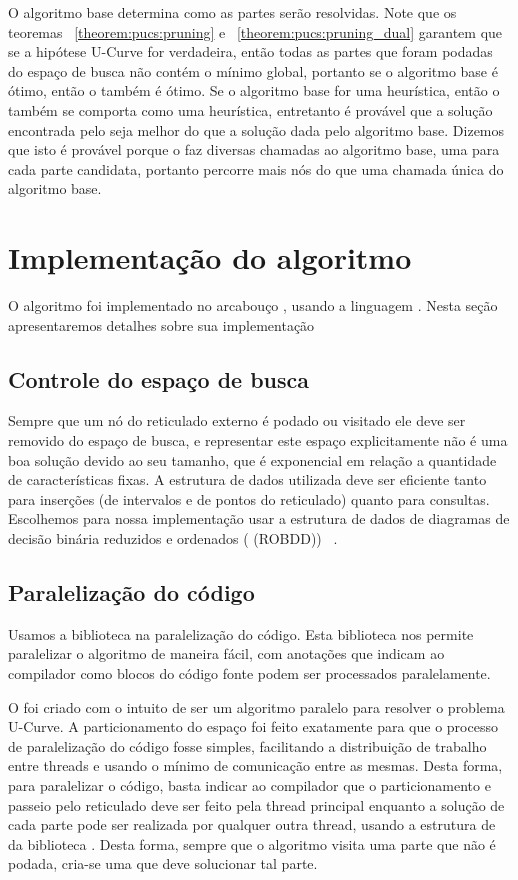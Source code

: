 O algoritmo base determina como as partes serão resolvidas. Note que os 
teoremas ~\ref{theorem:pucs:pruning} e ~\ref{theorem:pucs:pruning_dual}
garantem que se a hipótese U-Curve for verdadeira, então todas as partes
que foram podadas do espaço de busca não contém o mínimo global, 
portanto se o algoritmo base é ótimo, então o  também é
ótimo. Se o algoritmo base for uma heurística, então o 
também se comporta como uma heurística, entretanto é provável que a 
solução encontrada pelo  seja melhor do que a solução 
dada pelo algoritmo base. Dizemos que isto é provável porque o 
 faz diversas chamadas ao algoritmo base, uma para cada
parte candidata, portanto percorre mais nós do que uma chamada única do
algoritmo base.

\section{Implementação do algoritmo}
O algoritmo  foi implementado no arcabouço 
, usando a linguagem . Nesta seção 
apresentaremos detalhes sobre sua implementação 

\subsection{Controle do espaço de busca}
Sempre que um nó do reticulado externo é podado ou visitado ele deve ser
removido do espaço de busca, e representar este espaço explicitamente 
não é uma boa solução devido ao seu tamanho, que é exponencial em 
relação a quantidade de características fixas. A estrutura de dados 
utilizada deve ser eficiente tanto para inserções (de intervalos e de 
pontos do reticulado) quanto para consultas. Escolhemos para nossa 
implementação usar a estrutura de dados de diagramas de decisão binária
reduzidos e ordenados ( (ROBDD)) ~\cite{Bry86}.

\subsection{Paralelização do código}
Usamos a biblioteca  na paralelização do código.
Esta biblioteca nos permite paralelizar o algoritmo de maneira fácil,
com anotações que indicam ao compilador como blocos do código fonte 
podem ser processados paralelamente.

O  foi criado com o intuito de ser um algoritmo paralelo
para resolver o problema U-Curve. A particionamento do espaço foi feito
exatamente para que o processo de paralelização do código fosse simples,
facilitando a distribuição de trabalho entre threads e usando o mínimo
de comunicação entre as mesmas. Desta forma, para paralelizar o código,
basta indicar ao compilador que o particionamento e passeio pelo 
reticulado deve ser feito pela thread principal enquanto a solução de 
cada parte pode ser realizada por qualquer outra thread, usando a
estrutura de  da biblioteca . 
Desta forma, sempre que o algoritmo visita uma parte que não é podada, 
cria-se uma  que deve solucionar tal parte. 

